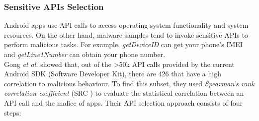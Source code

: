 \subsubsection{Sensitive APIs Selection} 
Android apps use API calls to access operating system functionality and system resources. On the other hand, malware samples tend to invoke sensitive APIs to perform malicious tasks. For example, \textit{getDeviceID} can get your phone’s IMEI and \textit{getLine1Number} can obtain your phone number. \\
Gong \textit{et al.} \cite{gong2020experiences} showed that, out of the >50k API calls provided by the current Android SDK (Software Developer Kit), there are 426 that have a high correlation to malicious behaviour. To find this subset, they used \textit{Spearman’s rank correlation coefficient} (SRC \cite{spearman1904proof}) to evaluate the statistical correlation between an API call and the malice of apps. Their API selection approach consists of four steps:

